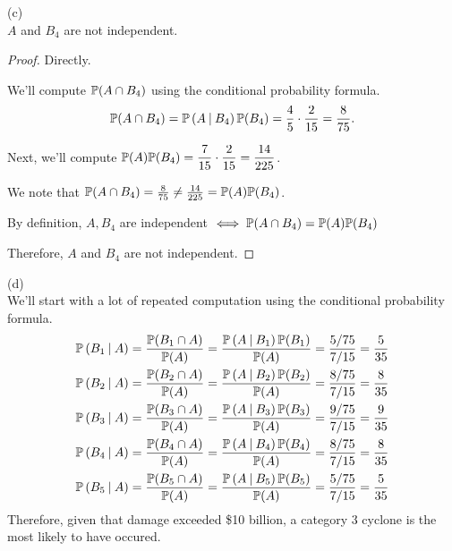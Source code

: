 \documentclass[a4paper,12pt]{report}
\begin{document}
\newpage
\sol (c) \\
$A$ and $B_4$ are not independent.
\begin{proof}
  Directly.
  \begin{list}{}{\setlength{\leftmargin}{1in}\setlength{\topsep}{0pt}}\item
    We'll compute $\mathbb{P}(A\cap B_4)$ using the conditional probability formula.
    $$
      \mathbb{P}(A\cap B_4) = \mathbb{P}\left( A\medspace\middle|\medspace B_4 \right)\mathbb{P}(B_4) = \frac{4}{5}\cdot\frac{2}{15} = \frac{8}{75}.
    $$

    Next, we'll compute $\displaystyle{\mathbb{P}(A)\mathbb{P}(B_4) = \frac{7}{15}\cdot\frac{2}{15}= \frac{14}{225}}$.

    We note that $\mathbb{P}(A\cap B_4) = \frac{8}{75} \neq \frac{14}{225} = \mathbb{P}(A)\mathbb{P}(B_4)$.

    By definition, $A, B_4$ are independent $\iff \mathbb{P}(A\cap B_4) = \mathbb{P}(A)\mathbb{P}(B_4)$
  \end{list}
  Therefore, $A$ and $B_4$ are not independent.
\end{proof}

\sol (d) \\
We'll start with a lot of repeated computation using the conditional probability formula.
\begin{gather*}
  \mathbb{P}\left( B_1 \medspace\middle|\medspace A \right) = \frac{\mathbb{P}(B_1 \cap A)}{\mathbb{P}(A)} = \frac{\mathbb{P}\left( A \medspace\middle|\medspace B_1 \right)\mathbb{P}(B_1)}{\mathbb{P}(A)} = \frac{5/75}{7/15} = \frac{5}{35} \\
  \mathbb{P}\left( B_2 \medspace\middle|\medspace A \right) = \frac{\mathbb{P}(B_2 \cap A)}{\mathbb{P}(A)} = \frac{\mathbb{P}\left( A \medspace\middle|\medspace B_2 \right)\mathbb{P}(B_2)}{\mathbb{P}(A)} = \frac{8/75}{7/15} = \frac{8}{35} \\
  \mathbb{P}\left( B_3 \medspace\middle|\medspace A \right) = \frac{\mathbb{P}(B_3 \cap A)}{\mathbb{P}(A)} = \frac{\mathbb{P}\left( A \medspace\middle|\medspace B_3 \right)\mathbb{P}(B_3)}{\mathbb{P}(A)} = \frac{9/75}{7/15} = \frac{9}{35} \\
  \mathbb{P}\left( B_4 \medspace\middle|\medspace A \right) = \frac{\mathbb{P}(B_4 \cap A)}{\mathbb{P}(A)} = \frac{\mathbb{P}\left( A \medspace\middle|\medspace B_4 \right)\mathbb{P}(B_4)}{\mathbb{P}(A)} = \frac{8/75}{7/15} = \frac{8}{35} \\
  \mathbb{P}\left( B_5 \medspace\middle|\medspace A \right) = \frac{\mathbb{P}(B_5 \cap A)}{\mathbb{P}(A)} = \frac{\mathbb{P}\left( A \medspace\middle|\medspace B_5 \right)\mathbb{P}(B_5)}{\mathbb{P}(A)} = \frac{5/75}{7/15} = \frac{5}{35}
\end{gather*}
Therefore, given that damage exceeded \$10 billion, a category 3 cyclone is the most likely to have occured.
\end{document}
